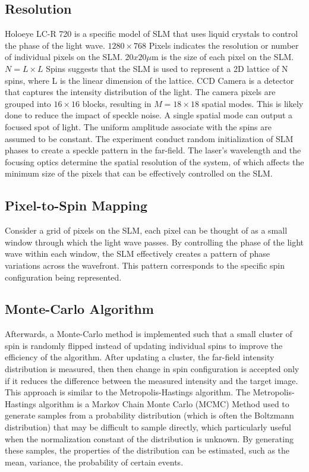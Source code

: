 \subsection{Resolution}
Holoeye LC-R 720 is a specific model of SLM that uses liquid crystals to control the phase of the light wave. $1280 \times 768$ Pixels indicates the resolution or number of individual pixels on the SLM. $20 x 20 \mu$m is the size of each pixel on the SLM. $N = L \times L$ Spins suggests that the SLM is used to represent a 2D lattice of N spins, where L is the linear dimension of the lattice. CCD Camera is a detector that captures the intensity distribution of the light. The camera pixels are grouped into $16 \times 16$ blocks, resulting in $M = 18 \times 18$ spatial modes. This is likely done to reduce the impact of speckle noise. A single spatial mode can output a focused spot of light. The uniform amplitude associate with the spins are assumed to be constant. The experiment conduct random initialization of SLM phases to create a speckle pattern in the far-field. The laser's wavelength and the focusing optics determine the spatial resolution of the system, of which affects the minimum size of the pixels that can be effectively controlled on the SLM. \\

\subsection{Pixel-to-Spin Mapping}
Consider a grid of pixels on the SLM, each pixel can be thought of as a small window through which the light wave passes. By controlling the phase of the light wave within each window, the SLM effectively creates a pattern of phase variations across the wavefront. This pattern corresponds to the specific spin configuration being represented.

\subsection{Monte-Carlo Algorithm}
Afterwards, a Monte-Carlo method is implemented such that a small cluster of spin is randomly flipped instead of updating individual spins to improve the efficiency of the algorithm. After updating a cluster, the far-field intensity distribution is measured, then then change in spin configuration is accepted only if it reduces the difference between the measured intensity and the target image. This approach is similar to the Metropolis-Hastings algorithm. The Metropolis-Hastings algorithm is a Markov Chain Monte Carlo (MCMC) Method used to generate samples from a probability distribution (which is often the Boltzmann distribution) that may be difficult to sample directly, which particularly useful when the normalization constant of the distribution is unknown. By generating these samples, the properties of the distribution can be estimated, such as the mean, variance, the probability of certain events.\\

